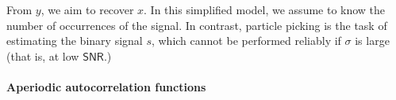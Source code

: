 \documentclass[english,11pt]{article}
\newcommand{\1}{\mathbf{1}}
\numberwithin{equation}{section}
\theoremstyle{plain}
\theoremstyle{definition}
\theoremstyle{remark}
\theoremstyle{plain}
\theoremstyle{remark}
\theoremstyle{plain}
\theoremstyle{plain}
\newcommand{\SNR}{\ensuremath{\textsf{SNR}}}
\begin{document}
From $y$, we aim to recover $x$. In this simplified model, we assume to know the number of  occurrences of the signal. In contrast, particle picking is the task of estimating the binary signal $s $, which cannot  be performed reliably if $\sigma$ is large (that is, at low $\SNR$.)


%



%
%

\paragraph{Aperiodic autocorrelation functions}
\end{document}
